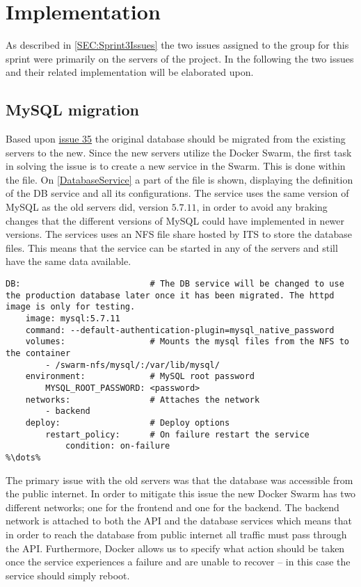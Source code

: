 \section{Implementation} \label{SEC:Sprint3Implementation}
As described in \autoref{SEC:Sprint3Issues} the two issues assigned to the group for this sprint were primarily on the servers of the project.
In the following the two issues and their related implementation will be elaborated upon.

\subsection{MySQL migration}
Based upon \href{https://github.com/aau-giraf/wiki/issues/35}{issue 35} the original database should be migrated from the existing servers to the new.
Since the new servers utilize the Docker Swarm, the first task in solving the issue is to create a new service in the Swarm.
This is done within the  file.
On \autoref{DatabaseService} a part of the file is shown, displaying the definition of the DB service and all its configurations.
The service uses the same version of MySQL as the old servers did, version $5.7.11$, in order to avoid any braking changes that the different versions of MySQL could have implemented in newer versions.
The services uses an NFS file share hosted by ITS to store the database files.
This means that the service can be started in any of the servers and still have the same data available.

\begin{lstlisting}[caption={Docker database service},captionpos=b,label=DatabaseService,escapechar=\%]
%\dots%
DB:                          # The DB service will be changed to use the production database later once it has been migrated. The httpd image is only for testing.
    image: mysql:5.7.11
    command: --default-authentication-plugin=mysql_native_password
    volumes:                 # Mounts the mysql files from the NFS to the container
        - /swarm-nfs/mysql/:/var/lib/mysql/
    environment:             # MySQL root password
        MYSQL_ROOT_PASSWORD: <password>
    networks:                # Attaches the network
        - backend
    deploy:                  # Deploy options
        restart_policy:      # On failure restart the service
            condition: on-failure
%\dots%
\end{lstlisting}

The primary issue with the old servers was that the database was accessible from the public internet.
In order to mitigate this issue the new Docker Swarm has two different networks; one for the frontend and one for the backend.
The backend network is attached to both the API and the database services which means that in order to reach the database from public internet all traffic must pass through the API.
Furthermore, Docker allows us to specify what action should be taken once the service experiences a failure and are unable to recover -- in this case the service should simply reboot.

